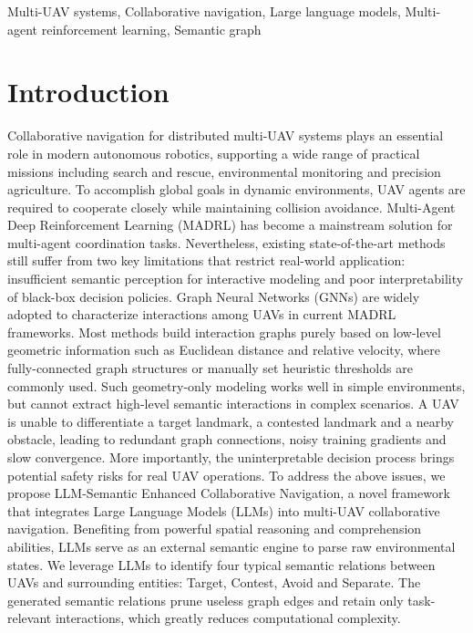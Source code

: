 \documentclass[conference]{IEEEtran}
\begin{document}
\begin{IEEEkeywords}
Multi-UAV systems, Collaborative navigation, Large language models, Multi-agent reinforcement learning, Semantic graph
\end{IEEEkeywords}

\section{Introduction}
Collaborative navigation for distributed multi-UAV systems plays an essential role in modern autonomous robotics, supporting a wide range of practical missions including search and rescue, environmental monitoring and precision agriculture. To accomplish global goals in dynamic environments, UAV agents are required to cooperate closely while maintaining collision avoidance. Multi-Agent Deep Reinforcement Learning (MADRL) has become a mainstream solution for multi-agent coordination tasks. Nevertheless, existing state-of-the-art methods still suffer from two key limitations that restrict real-world application: insufficient semantic perception for interactive modeling and poor interpretability of black-box decision policies.
Graph Neural Networks (GNNs) are widely adopted to characterize interactions among UAVs in current MADRL frameworks. Most methods build interaction graphs purely based on low-level geometric information such as Euclidean distance and relative velocity, where fully-connected graph structures or manually set heuristic thresholds are commonly used. Such geometry-only modeling works well in simple environments, but cannot extract high-level semantic interactions in complex scenarios. A UAV is unable to differentiate a target landmark, a contested landmark and a nearby obstacle, leading to redundant graph connections, noisy training gradients and slow convergence. More importantly, the uninterpretable decision process brings potential safety risks for real UAV operations.
To address the above issues, we propose LLM-Semantic Enhanced Collaborative Navigation, a novel framework that integrates Large Language Models (LLMs) into multi-UAV collaborative navigation. Benefiting from powerful spatial reasoning and comprehension abilities, LLMs serve as an external semantic engine to parse raw environmental states. We leverage LLMs to identify four typical semantic relations between UAVs and surrounding entities: Target, Contest, Avoid and Separate. The generated semantic relations prune useless graph edges and retain only task-relevant interactions, which greatly reduces computational complexity.
\end{document}
